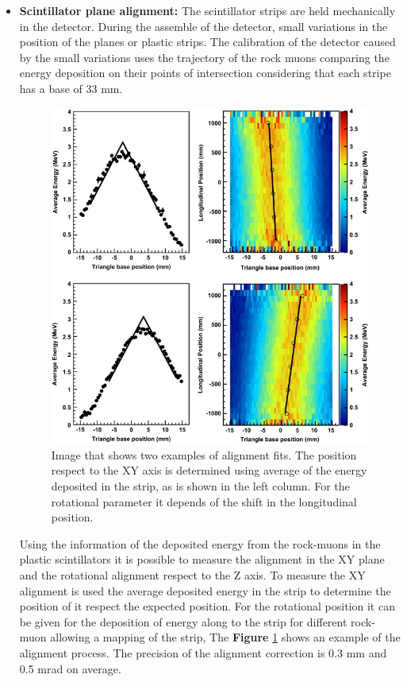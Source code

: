 \begin{itemize}
    
    \item \textbf{Scintillator plane alignment:} The scintillator strips are held mechanically in the detector. During the assemble of the detector, small variations in the position of the planes or plastic strips. The calibration of the detector caused by the small variations uses the trajectory of the rock muons comparing the energy deposition on their points of intersection considering that each stripe has a base of 33 mm. 
    \begin{figure}[!htb]
        \centering
        \includegraphics[scale=0.6]{Figures/Chapter2/AlignmentProfile.jpg}
        \caption{Image that shows two examples of alignment fits. The position respect to the XY axis is determined using average of the energy deposited in the strip, as is shown in  the left column. For the rotational parameter it depends of the shift in the longitudinal position.}
        \label{fig:MnvExp:MnvDetector:Calibration:InSitu:Alignment}
    \end{figure}
    Using the information of the deposited energy from the rock-muons in the plastic scintillators it is possible to measure the alignment in the XY plane and the rotational alignment respect to the Z axis. To measure the XY alignment is used the average deposited energy in the strip to determine the position of it respect the expected position. For the rotational position it can be given for the deposition of energy along to the strip for different rock-muon allowing a mapping of the strip, The \textbf{Figure} \ref{fig:MnvExp:MnvDetector:Calibration:InSitu:Alignment} shows an example of the alignment process. The precision of the alignment correction is 0.3 mm and 0.5 mrad on average.
    



\end{itemize}
